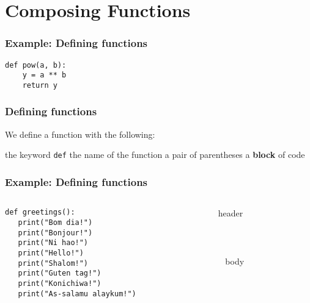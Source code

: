 \documentclass[11pt]{beamer}
\begin{document}
\section{Composing Functions}

\begin{frame}[fragile]
	\frametitle{Example:  Defining functions}
	\Enlarge
	
 \begin{Verbatim}[commandchars=\\\{\},commentchar=\%]
def pow(a, b):
    y = a ** b
    return y
\end{Verbatim}
\end{frame}

\begin{frame}[fragile]
	\frametitle{Defining functions}
	\Enlarge
	
	\begin{itemize}
		\myitem  We define a function with the following:
		\begin{itemize}
			\mysubitem  the keyword \texttt{def}
			\mysubitem  the name of the function
			\mysubitem  a pair of parentheses
			\mysubitem  a \textbf{block} of code
		\end{itemize}
	\end{itemize}
\end{frame}

\begin{frame}[fragile]
	\frametitle{Example:  Defining functions}
	\Enlarge
	
	\begin{columns}
		\begin{column}{0.75\textwidth}
			\begin{Verbatim}[commandchars=\\\{\},commentchar=\%]
def greetings():
   print("Bom dia!")
   print("Bonjour!")
   print("Ni hao!")
   print("Hello!")
   print("Shalom!")
   print("Guten tag!")
   print("Konichiwa!")
   print("As-salamu alaykum!")
			\end{Verbatim}
		\end{column}
		\begin{column}{0.25\textwidth}
			header \\ ~ \\ ~ \\ ~ \\ ~ body \\ ~ \\ ~ \\ ~ \\ ~ \\
		\end{column}
	\end{columns}
\end{frame}
\end{document}
